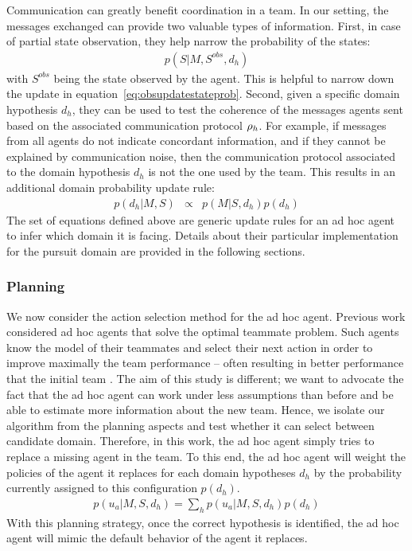 Communication can greatly benefit coordination in a team. In our setting, the messages exchanged can provide two valuable types of information. First, in case of partial state observation, they help narrow the probability of the states:
%
\begin{eqnarray}
p(S|M, S^{obs}, d_h)
\label{eq:stateupdate}
\end{eqnarray}
%
with $S^{obs}$ being the state observed by the agent. This is helpful to narrow down the update in equation~\ref{eq:obsupdatestateprob}. Second, given a specific domain hypothesis $d_h$, they can be used to test the coherence of the messages agents sent based on the associated communication protocol $\rho_h$. For example, if messages from all agents do not indicate concordant information, and if they cannot be explained by communication noise, then the communication protocol associated to the domain hypothesis $d_h$ is not the one used by the team. This results in an additional domain probability update rule:
%
\begin{eqnarray}
p(d_h|M,S) &\propto& p(M|S,d_h) p(d_h)
\label{eq:messageupdate}
\end{eqnarray}
%
The set of equations defined above are generic update rules for an ad hoc agent to infer which domain it is facing. Details about their particular implementation for the pursuit domain are provided in the following sections.

\subsubsection{Planning}

We now consider the action selection method for the ad hoc agent. Previous work considered ad hoc agents that solve the optimal teammate problem. Such agents know the model of their teammates and select their next action in order to improve maximally the team performance -- often resulting in better performance that the initial team \cite{barrett2011empirical}. The aim of this study is different; we want to advocate the fact that the ad hoc agent can work under less assumptions than before and be able to estimate more information about the new team. Hence, we isolate our algorithm from the planning aspects and test whether it can select between candidate domain. Therefore, in this work, the ad hoc agent simply tries to replace a missing agent in the team. To this end, the ad hoc agent will weight the policies of the agent it replaces for each domain hypotheses $d_h$ by the probability currently assigned to this configuration $p(d_h)$.
%
\begin{eqnarray}
p(u_a|M, S,d_h) = \sum_h p(u_a|M, S, d_h) p(d_h)
\label{eq:adhocpolicy}
\end{eqnarray}
%
With this planning strategy, once the correct hypothesis is identified, the ad hoc agent will mimic the default behavior of the agent it replaces.%
